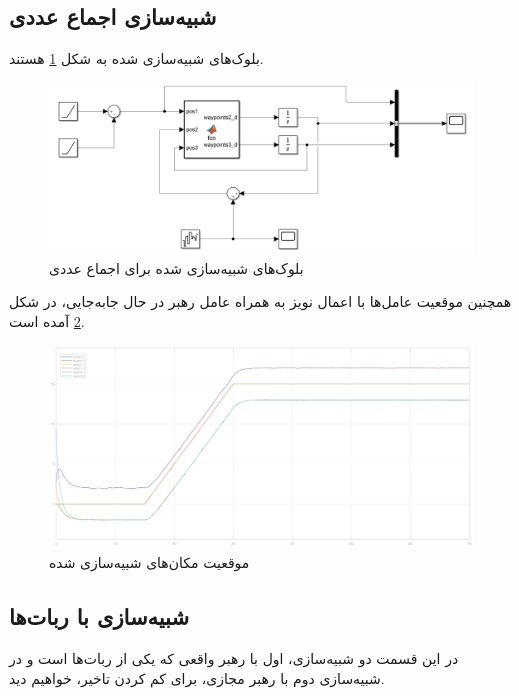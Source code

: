 \subsection{شبیه‌سازی اجماع عددی}
بلوک‌های شبیه‌سازی شده به شکل \ref{Fig numeric-platoon} هستند.
\begin{figure}[!h] 
	\centering
	\includegraphics[scale=0.3]{Images/numeric-platoon.png}
	\caption{بلوک‌های شبیه‌سازی شده برای اجماع عددی} \label{Fig numeric-platoon}
\end{figure}

همچنین موقعیت عامل‌ها با اعمال نویز به همراه عامل رهبر در حال جابه‌جایی، در شکل \ref{Fig numeric-platoon pos} آمده است.
\begin{figure}[!h] 
	\centering
	\includegraphics[scale=0.12]{Images/numeric-platoon pos.jpg}
	\caption{موقعیت مکان‌های شبیه‌سازی شده} \label{Fig numeric-platoon pos}
\end{figure}

\subsection{شبیه‌سازی با ربات‌ها}
در این قسمت دو شبیه‌سازی، اول با رهبر واقعی که یکی از ربات‌ها است و در شبیه‌سازی دوم با رهبر مجازی، برای کم کردن تاخیر، خواهیم دید.

